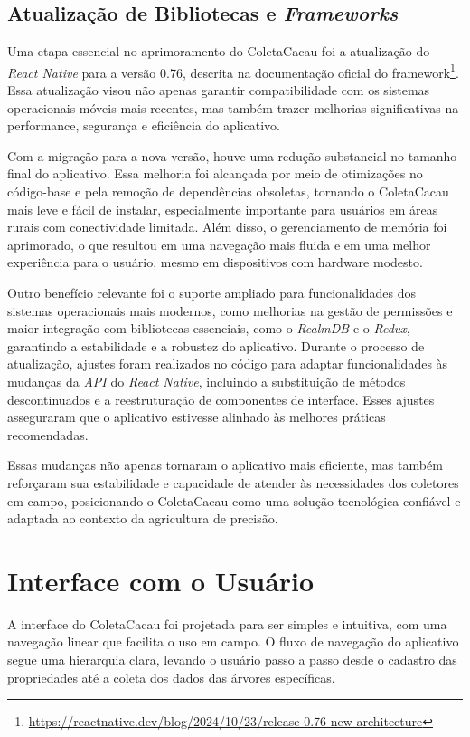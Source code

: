 \subsection{Atualização de Bibliotecas e \textit{Frameworks}}
Uma etapa essencial no aprimoramento do ColetaCacau foi a atualização do \textit{React Native} para a versão 0.76, descrita na documentação oficial do framework\footnote{\url{https://reactnative.dev/blog/2024/10/23/release-0.76-new-architecture}}. Essa atualização visou não apenas garantir compatibilidade com os sistemas operacionais móveis mais recentes, mas também trazer melhorias significativas na performance, segurança e eficiência do aplicativo.

Com a migração para a nova versão, houve uma redução substancial no tamanho final do aplicativo. Essa melhoria foi alcançada por meio de otimizações no código-base e pela remoção de dependências obsoletas, tornando o ColetaCacau mais leve e fácil de instalar, especialmente importante para usuários em áreas rurais com conectividade limitada. Além disso, o gerenciamento de memória foi aprimorado, o que resultou em uma navegação mais fluida e em uma melhor experiência para o usuário, mesmo em dispositivos com hardware modesto.

Outro benefício relevante foi o suporte ampliado para funcionalidades dos sistemas operacionais mais modernos, como melhorias na gestão de permissões e maior integração com bibliotecas essenciais, como o \textit{RealmDB} e o \textit{Redux}, garantindo a estabilidade e a robustez do aplicativo. Durante o processo de atualização, ajustes foram realizados no código para adaptar funcionalidades às mudanças da \textit{API} do \textit{React Native}, incluindo a substituição de métodos descontinuados e a reestruturação de componentes de interface. Esses ajustes asseguraram que o aplicativo estivesse alinhado às melhores práticas recomendadas.

Essas mudanças não apenas tornaram o aplicativo mais eficiente, mas também reforçaram sua estabilidade e capacidade de atender às necessidades dos coletores em campo, posicionando o ColetaCacau como uma solução tecnológica confiável e adaptada ao contexto da agricultura de precisão.

\section{Interface com o Usuário}
A interface do ColetaCacau foi projetada para ser simples e intuitiva, com uma navegação linear que facilita o uso em campo. O fluxo de navegação do aplicativo segue uma hierarquia clara, levando o usuário passo a passo desde o cadastro das propriedades até a coleta dos dados das árvores específicas.

